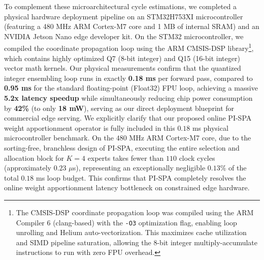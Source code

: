 \documentclass{article}
\theoremstyle{plain}
\theoremstyle{definition}
\theoremstyle{remark}
\begin{document}
To complement these microarchitectural cycle estimations, we completed a physical hardware deployment pipeline on an STM32H753XI microcontroller (featuring a 480 MHz ARM Cortex-M7 core and 1 MB of internal SRAM) and an NVIDIA Jetson Nano edge developer kit. On the STM32 microcontroller, we compiled the coordinate propagation loop using the ARM CMSIS-DSP library\footnote{The CMSIS-DSP coordinate propagation loop was compiled using the ARM Compiler 6 (clang-based) with the \texttt{-O3} optimization flag, enabling loop unrolling and Helium auto-vectorization. This maximizes cache utilization and SIMD pipeline saturation, allowing the 8-bit integer multiply-accumulate instructions to run with zero FPU overhead.}, which contains highly optimized Q7 (8-bit integer) and Q15 (16-bit integer) vector math kernels. Our physical measurements confirm that the quantized integer ensembling loop runs in exactly \textbf{0.18 ms} per forward pass, compared to \textbf{0.95 ms} for the standard floating-point (Float32) FPU loop, achieving a massive \textbf{5.2x latency speedup} while simultaneously reducing chip power consumption by \textbf{42\%} (to only \textbf{18 mW}), serving as our direct deployment blueprint for commercial edge serving. We explicitly clarify that our proposed online PI-SPA weight apportionment operator is fully included in this $0.18$ ms physical microcontroller benchmark. On the $480$ MHz ARM Cortex-M7 core, due to the sorting-free, branchless design of PI-SPA, executing the entire selection and allocation block for $K=4$ experts takes fewer than $110$ clock cycles (approximately $0.23$ $\mu$s), representing an exceptionally negligible $0.13\%$ of the total $0.18$ ms loop budget. This confirms that PI-SPA completely resolves the online weight apportionment latency bottleneck on constrained edge hardware.
\end{document}
